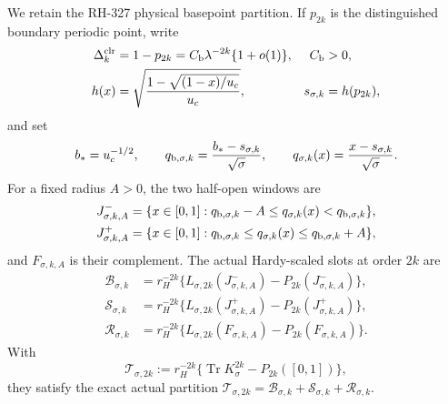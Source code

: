 \documentclass[11pt]{article}
\theoremstyle{remark}
\newcommand{\Tr}{\operatorname{Tr}}
\newcommand{\cB}{\mathcal B}
\newcommand{\cR}{\mathcal R}
\newcommand{\cS}{\mathcal S}
\newcommand{\cT}{\mathcal T}
\begin{document}
We retain the RH-327 physical basepoint partition.  If $p_{2k}$ is the
distinguished boundary periodic point, write
\begin{align}
 \Delta_k^{\rm clr}
 &=1-p_{2k}=C_{\rm b}\lambda^{-2k}\{1+o(1)\},
 & C_{\rm b}&>0,
 \label{eq:clearance}\\
 h(x)&=\sqrt{\frac{1-\sqrt{(1-x)/u_c}}{u_c}},
 &s_{\sigma,k}&=h(p_{2k}),
 \label{eq:source}
\end{align}
and set
\begin{equation}
 b_*=u_c^{-1/2},
 \qquad
 q_{{\rm b},\sigma,k}=\frac{b_*-s_{\sigma,k}}{\sqrt\sigma},
 \qquad
 q_{\sigma,k}(x)=\frac{x-s_{\sigma,k}}{\sqrt\sigma}.
 \label{eq:partition-coordinate}
\end{equation}
For a fixed radius $A>0$, the two half-open windows are
\begin{align}
 J^-_{\sigma,k,A}
 &=\{x\in[0,1]:q_{{\rm b},\sigma,k}-A
       \le q_{\sigma,k}(x)<q_{{\rm b},\sigma,k}\},
 \label{eq:left-window}\\
 J^+_{\sigma,k,A}
 &=\{x\in[0,1]:q_{{\rm b},\sigma,k}
       \le q_{\sigma,k}(x)\le q_{{\rm b},\sigma,k}+A\},
 \label{eq:right-window}
\end{align}
and $F_{\sigma,k,A}$ is their complement.  The actual Hardy-scaled slots at
order $2k$ are
\begin{align}
 \cB_{\sigma,k}
 &=r_H^{-2k}\{L_{\sigma,2k}(J^-_{\sigma,k,A})
                  -P_{2k}(J^-_{\sigma,k,A})\},
 \label{eq:boundary-slot}\\
 \cS_{\sigma,k}
 &=r_H^{-2k}\{L_{\sigma,2k}(J^+_{\sigma,k,A})
                  -P_{2k}(J^+_{\sigma,k,A})\},
 \label{eq:shell-slot}\\
 \cR_{\sigma,k}
 &=r_H^{-2k}\{L_{\sigma,2k}(F_{\sigma,k,A})
                  -P_{2k}(F_{\sigma,k,A})\}.
 \label{eq:far-slot}
\end{align}
With
\begin{equation}
 \cT_{\sigma,2k}
 :=r_H^{-2k}\{\Tr K_\sigma^{2k}-P_{2k}([0,1])\},
 \label{eq:raw-packet}
\end{equation}
they satisfy the exact actual partition
$\cT_{\sigma,2k}=\cB_{\sigma,k}+\cS_{\sigma,k}+\cR_{\sigma,k}$.
\end{document}
